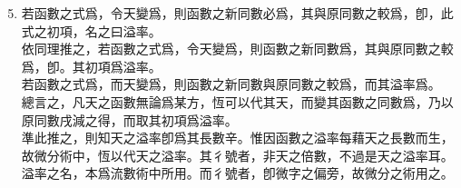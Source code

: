 \begin{enumerate} [label={第\chinese*款},nolistsep]
	\setcounter{enumi}{4}
	\item 若函數之式爲\CJKmove，令天變爲\CJKmove，則函數之新同數必爲\CJKmove，其與原同數之較爲\CJKmove，卽\CJKmove，此式之初項\CJKmove，名之曰溢率。\\
	依同理推之，若函數之式爲\CJKmove，令天變爲\CJKmove，則函數之新同數爲\CJKmove，其與原同數之較爲\CJKmove，卽\CJKmove。其初項\CJKmove 爲溢率。\\
	若函數之式爲\CJKmove，而天變爲\CJKmove，則函數之新同數與原同數之較爲\CJKmove，而其溢率爲\CJKmove。\\
	總言之，凡天之函數無論爲某方，恆可以\CJKmove 代其天，而變其函數之同數爲\CJKmove，乃以原同數戌減之得\CJKmove，而取其初項\CJKmove 爲溢率。\\
	準此推之，則知天之溢率卽爲其長數辛。惟因函數之溢率每藉天之長數而生，故微分術中，恆以\CJKmove 代天之溢率。其彳號者，非天之倍數，不過是天之溢率耳。溢率之名，本爲流數術中所用。而彳號者，卽微字之偏旁，故微分之術用之。\\

\end{enumerate}
